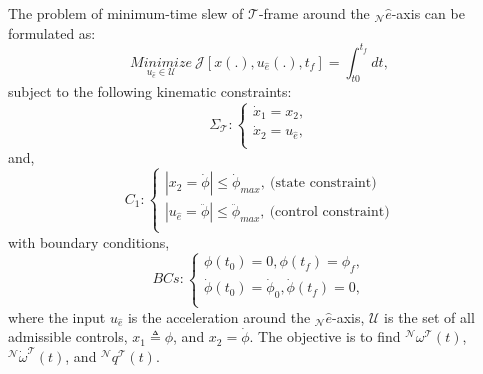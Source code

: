 \documentclass[journal ]{new-aiaa}
\begin{document}
The problem of minimum-time slew of $\mathcal{T}$-frame around the $_\mathcal{N}\hat{e}$-axis can be formulated as:	
	\begin{equation}\label{costfunction}
	\underset{u_{\hat{e}}\in \mathcal{U}}{Minimize}\ \mathcal{J}[x(.), u_{\hat{e}}(.), t_f]=\int_{t0}^{t_f} dt,
	\end{equation}	
	subject to the following kinematic constraints:	
	\begin{equation}\label{system}
	\Sigma_\mathcal{T}:\left\{
	\begin{array}{l}
	\dot{x}_1=x_2, \\
	\dot{x}_2=u_{\hat{e}}, \\
	\end{array}
	\right.
	\end{equation}
	and,
\begin{equation}\label{constraints1}
	C_1:\left\{
	\begin{array}{l}
	|x_2=\dot{\phi}|\leq \dot{\phi}_{max},\ \text{(state constraint)}\\
	|u_{\hat{e}}=\ddot{\phi}|\leq \ddot{\phi}_{max},\ \text{(control constraint)}\\
	\end{array}
	\right.
	\end{equation}
with boundary conditions,
	\begin{equation}\label{Bcs}
	BCs:\left\{
	\begin{array}{l}
	\phi(t_0)=0, \phi(t_f)=\phi_{f},\\
	\dot{\phi}(t_0)=\dot{\phi}_{0},\dot{ \phi}(t_f)=0, \\
	\end{array}
	\right.
	\end{equation}
where the input $u_{\hat{e}}$ is the acceleration around the  $_\mathcal{N}\hat{e}$-axis, $\mathcal{U}$ is the set of all admissible controls, $x_1 \triangleq\phi$, and $x_2=\dot{\phi}$. The objective is to find $^\mathcal{N}\omega^\mathcal{T}(t)$, $^\mathcal{N}\dot{\omega}^\mathcal{T}(t)$, and $^\mathcal{N}q^\mathcal{T}(t)$.\\ %
\end{document}
